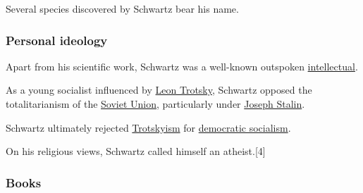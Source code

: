 \documentclass{article}
\begin{document}
Several species discovered by Schwartz bear his name.

\subsubsection{Personal ideology}
Apart from his scientific work, Schwartz was a well-known outspoken \href{https://en.wikipedia.org/wiki/Intellectual}{intellectual}.

As a young socialist influenced by \href{https://en.wikipedia.org/wiki/Leon_Trotsky}{Leon Trotsky}, Schwartz opposed the \href{https://en.wikipedia.org/wiki/Totalitarianism}{}{totalitarianism} of the \href{https://en.wikipedia.org/wiki/Soviet_Union}{Soviet Union}, particularly under \href{https://en.wikipedia.org/wiki/Joseph_Stalin}{Joseph Stalin}.

Schwartz ultimately rejected \href{https://en.wikipedia.org/wiki/Trotskyism}{Trotskyism} for \href{https://en.wikipedia.org/wiki/Democratic_socialism}{democratic socialism}.

%
On his religious views, Schwartz called himself an atheist.[4]

\subsubsection{Books}
\end{document}

